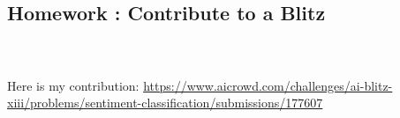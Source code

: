 \documentclass[14pt]
{article}
\begin{document}
\pagestyle{fancy}

\bigskip
\begin{center}
	\section*{\textbf{{\LARGE Homework : Contribute to a Blitz}}}
\end{center}
\bigskip\bigskip\bigskip

\paragraph*{\\}Here is my contribution: \href{https://www.aicrowd.com/challenges/ai-blitz-xiii/problems/sentiment-classification/submissions/177607}{https://www.aicrowd.com/challenges/ai-blitz-xiii/problems/sentiment-classification/submissions/177607}\\
\end{document}
